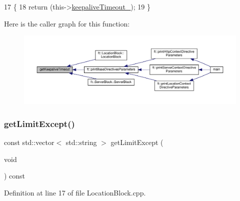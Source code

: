 \begin{DoxyCode}
17     \{
18         \textcolor{keywordflow}{return} (this->\hyperlink{classft_1_1_base_directives_aa1f5f394b428d0d18765a9b9e14e648f}{keepaliveTimeout\_});
19     \}
\end{DoxyCode}
Here is the caller graph for this function\+:
\nopagebreak
\begin{figure}[H]
\begin{center}
\leavevmode
\includegraphics[width=350pt]{classft_1_1_base_directives_ab8574338758f65325cab5d1c394826c8_icgraph}
\end{center}
\end{figure}
\mbox{\label{classft_1_1_location_block_ad2dc75d3f9c9f06f31e3948823557d52}} 
\subsubsection{\texorpdfstring{get\+Limit\+Except()}{getLimitExcept()}}
{\footnotesize\ttfamily const std\+::vector$<$ std\+::string $>$ get\+Limit\+Except (\begin{DoxyParamCaption}\item[{void}]{ }\end{DoxyParamCaption}) const}



Definition at line 17 of file Location\+Block.\+cpp.


